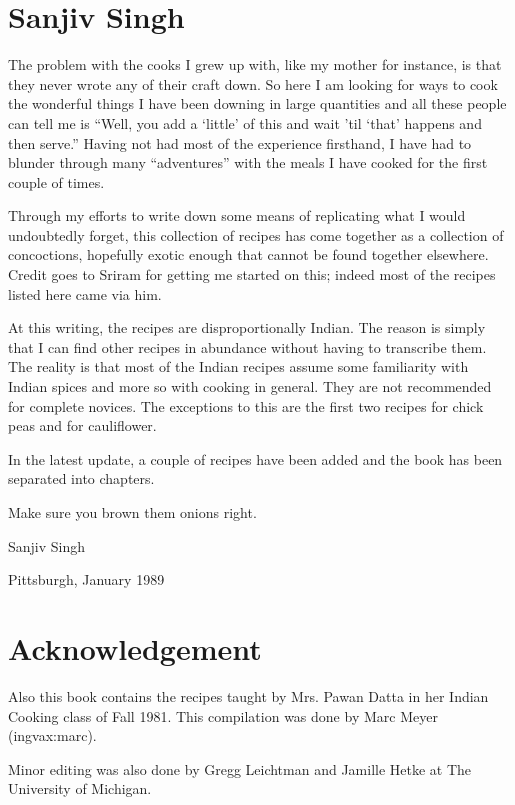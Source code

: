 \section{Sanjiv Singh}
  The  problem  with  the cooks I grew up with, like my mother for instance, is
that they never wrote any of their craft down.  So here I am looking  for  ways
to  cook  the wonderful things I have been downing in large quantities and all
these people can tell me is ``Well, you add a `little'  of  this  and  wait  'til
`that'  happens  and  then  serve.''  Having not had most of the experience
firsthand, I have had to blunder through many ``adventures'' with  the  meals  I  have
cooked for the first couple of times.

  Through  my  efforts  to  write  down  some means of replicating what I would
undoubtedly  forget,  this  collection  of  recipes  has  come  together  as  a
collection  of  concoctions,  hopefully  exotic  enough  that  cannot  be found
together elsewhere.  Credit goes to Sriram for getting me started on this; indeed
most of the recipes listed here came via him.

  At  this  writing,  the  recipes are disproportionally Indian.  The reason is
simply that I can find other recipes in abundance without having to  transcribe
them.    The reality is that most of the Indian recipes assume some familiarity
with Indian spices and  more  so  with  cooking  in  general.    They  are  not
recommended  for  complete  novices.    The exceptions to this are the first two
recipes for chick peas and for cauliflower.

  In the latest update, a couple of recipes have been added and  the  book  has
been separated into chapters.

  Make sure you brown them onions right.

                                                                   Sanjiv Singh

                                                       Pittsburgh, January 1989

\section{Acknowledgement}
Also this book contains the recipes taught by Mrs. Pawan Datta in her 
Indian Cooking class of Fall 1981.  This compilation was done by Marc Meyer
(ingvax:marc).

Minor editing was also done by Gregg Leichtman and Jamille Hetke at The
University of Michigan.

